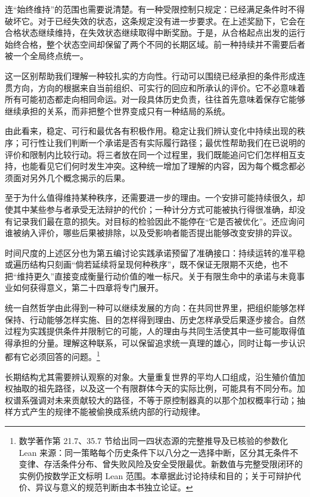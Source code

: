 \documentclass[
  11pt,
  oneside]{book}
\begin{document}
连``始终维持''的范围也需要说清楚。有一种受限控制只规定：已经满足条件时不得破坏它。对于已经失效的状态，这条规定没有进一步要求。在上述奖励下，它会在合格状态继续维持，在失效状态继续取得中断奖励。于是，从合格起点出发的运行始终合格，整个状态空间却保留了两个不同的长期区域。前一种持续并不需要后者被一个全局终点统一。

这一区别帮助我们理解一种较扎实的方向性。行动可以围绕已经承担的条件形成连贯方向，方向的根据来自当前组织、可实行的回应和所承认的评价。它不必意味着所有可能初态都走向相同命运。对一段具体历史负责，往往首先意味着保存它能够继续承担的关系，而非把整个世界变成只有一种结局的系统。

由此看来，稳定、可行和最优各有积极作用。稳定让我们辨认变化中持续出现的秩序；可行性让我们判断一个承诺是否有实际履行路径；最优性帮助我们在已说明的评价和限制内比较行动。将三者放在同一个过程里，我们既能追问它们怎样相互支持，也能看见它们何时发生冲突。这种统一增加了理解的内容，因为每个概念都必须面对另外几个概念揭示的后果。

至于为什么值得维持某种秩序，还需要进一步的理由。一个安排可能持续很久，却使其中某些参与者承受无法辩护的代价；一种计分方式可能被执行得很准确，却没有记录我们最在意的损失。对目标的检验因此不能停在``它是否被优化''。还应询问谁被纳入评价，哪些后果被排除，以及受影响者能否提出能够改变安排的异议。

时间尺度的上述区分也为第五编讨论实践承诺预留了准确接口：持续运转的准平稳或遍历结构只刻画``倘若延续将呈现何种秩序''，既不保证无限期不灭绝，也不把``维持更久''直接变成衡量行动价值的唯一标尺。关于有限生命中的承诺与未竟事业如何获得意义，第二十四章将专门展开。

统一自然哲学由此得到一种可以继续发展的方向：在共同世界里，把组织能够怎样保持、行动能够怎样实施、目的怎样得到理由、历史怎样承受后果逐步接合。自然过程为实践提供条件并限制它的可能，人的理由与共同生活使其中一些可能取得值得承担的分量。理解这种联系，可以保留追求统一真理的雄心，同时让每一步认识都有它必须回答的问题。\footnote{\hypertarget{ph-note-38}{}数学著作第 21.7、35.7 节给出同一四状态源的完整推导及已核验的参数化 Lean 来源：同一策略每个历史条件下以八分之一选择中断，区分其无条件不变律、存活条件分布、曾失败风险及安全受限最优。新数值与完整受限闭环的实例仍按数学正文标明 Lean 范围。本章据此讨论持续和目的；关于可辩护代价、异议与意义的规范判断由本书独立论证。}

长期结构尤其需要辨认观察的对象。大量重复世界的平均人口组成，沿生殖价值加权抽取的祖先路径，以及这一个有限群体今天的实际比例，可能具有不同分布。加权谱系强调对未来贡献较大的路径，不等于原控制器真的以那个加权概率行动；抽样方式产生的规律不能被偷换成系统内部的行动规律。
\end{document}
